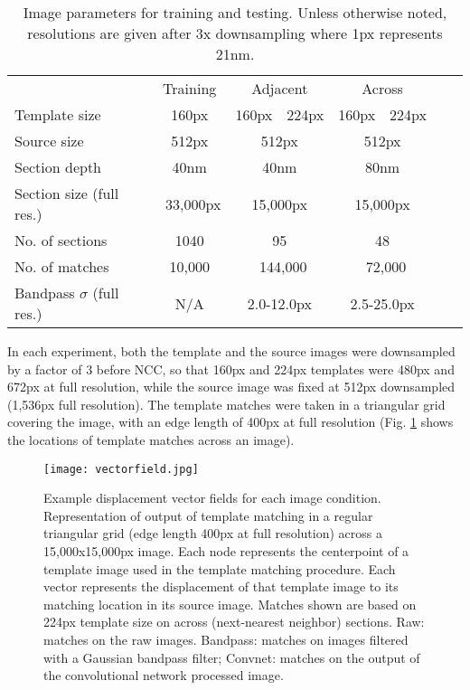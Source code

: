 \documentclass{article}
\begin{document}
\begin{table}[h]
    \caption{Image parameters for training and testing. Unless otherwise noted, resolutions are given after 3x downsampling where 1px represents 21nm.}
    \centering
     \small
    \begin{tabular}{l*{6}{c}r}
    
        \toprule
        & \multicolumn{1}{c}{Training} & \multicolumn{2}{c}{Adjacent}   &  \multicolumn{2}{c}{Across}\\
        \cmidrule{2-6}
        
        Template size   & 160px & 160px & 224px & 160px & 224px \\
        Source size     & 512px &\multicolumn{2}{c}{512px} &\multicolumn{2}{c}{512px} \\
        Section depth   & 40nm &\multicolumn{2}{c}{40nm} &\multicolumn{2}{c}{80nm} \\
        \cmidrule{2-6}
        Section size (full res.)    & ~33,000px & \multicolumn{2}{c}{15,000px} & \multicolumn{2}{c}{15,000px} \\
        No. of sections & 1040 & \multicolumn{2}{c}{95} & \multicolumn{2}{c}{48}\\
        No. of matches & 10,000 & \multicolumn{2}{c}{~144,000} & \multicolumn{2}{c}{~72,000}\\
        \cmidrule{2-6}
        Bandpass $\sigma$ (full res.) & N/A & \multicolumn{2}{c}{2.0-12.0px} & \multicolumn{2}{c}{2.5-25.0px}\\
       
        \bottomrule
    \end{tabular}
\label{table:parameters}
\end{table}


In each experiment, both the template and the source images were downsampled by a factor of 3 before NCC, so that 160px and 224px templates were 480px and 672px at full resolution, while the source image was fixed at 512px downsampled (1,536px full resolution). The template matches were taken in a triangular grid covering the image, with an edge length of 400px at full resolution (Fig. \ref{vectorfield} shows the locations of template matches across an image).

\begin{figure}[h]
  \centering
  
  \texttt{[image: vectorfield.jpg]} 
  \caption{Example displacement vector fields for each image condition. Representation of output of template matching in a regular triangular grid (edge length 400px at full resolution) across a 15,000x15,000px image. Each node represents the centerpoint of a template image used in the template matching procedure. Each vector represents the displacement of that template image to its matching location in its source image. Matches shown are based on 224px template size on across (next-nearest neighbor) sections. Raw: matches on the raw images. Bandpass: matches on images filtered with a Gaussian bandpass filter; Convnet: matches on the output of the convolutional network processed image.}
  \label{vectorfield}
\end{figure}
\end{document}
